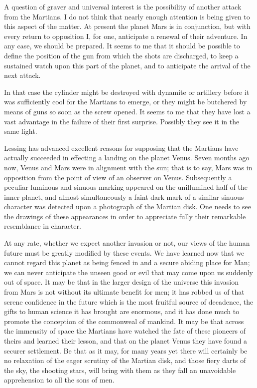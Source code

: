 A question of graver and universal interest is the possibility of another attack from the Martians. I do not think that nearly enough attention is being given to this aspect of the matter. At present the planet Mars is in conjunction, but with every return to opposition I, for one, anticipate a renewal of their adventure. In any case, we should be prepared. It seems to me that it should be possible to define the position of the gun from which the shots are discharged, to keep a sustained watch upon this part of the planet, and to anticipate the arrival of the next attack.

In that case the cylinder might be destroyed with dynamite or artillery before it was sufficiently cool for the Martians to emerge, or they might be butchered by means of guns so soon as the screw opened. It seems to me that they have lost a vast advantage in the failure of their first surprise. Possibly they see it in the same light.

Lessing has advanced excellent reasons for supposing that the Martians have actually succeeded in effecting a landing on the planet Venus. Seven months ago now, Venus and Mars were in alignment with the sun; that is to say, Mars was in opposition from the point of view of an observer on Venus. Subsequently a peculiar luminous and sinuous marking appeared on the unillumined half of the inner planet, and almost simultaneously a faint dark mark of a similar sinuous character was detected upon a photograph of the Martian disk. One needs to see the drawings of these appearances in order to appreciate fully their remarkable resemblance in character.

At any rate, whether we expect another invasion or not, our views of the human future must be greatly modified by these events. We have learned now that we cannot regard this planet as being fenced in and a secure abiding place for Man; we can never anticipate the unseen good or evil that may come upon us suddenly out of space. It may be that in the larger design of the universe this invasion from Mars is not without its ultimate benefit for men; it has robbed us of that serene confidence in the future which is the most fruitful source of decadence, the gifts to human science it has brought are enormous, and it has done much to promote the conception of the commonweal of mankind. It may be that across the immensity of space the Martians have watched the fate of these pioneers of theirs and learned their lesson, and that on the planet Venus they have found a securer settlement. Be that as it may, for many years yet there will certainly be no relaxation of the eager scrutiny of the Martian disk, and those fiery darts of the sky, the shooting stars, will bring with them as they fall an unavoidable apprehension to all the sons of men.

